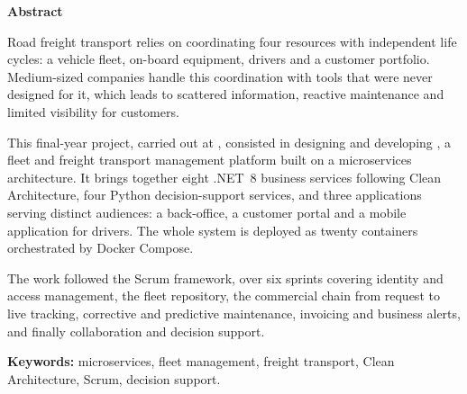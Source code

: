 \vspace{1.4cm}
\noindent{\color{grisFilet}\rule{\textwidth}{0.8pt}}
\vspace{1.4cm}

\begin{center}
  {\Large\sffamily\bfseries\color{noirTitre} Abstract\par}
\end{center}
\vspace{0.5cm}

Road freight transport relies on coordinating four resources with
independent life cycles: a vehicle fleet, on-board equipment, drivers and
a customer portfolio. Medium-sized companies handle this coordination
with tools that were never designed for it, which leads to scattered
information, reactive maintenance and limited visibility for customers.

This final-year project, carried out at \entreprise, consisted in
designing and developing \sujetCourt, a fleet and freight transport
management platform built on a microservices architecture. It brings
together eight .NET~8 business services following Clean Architecture,
four Python decision-support services, and three applications serving
distinct audiences: a back-office, a customer portal and a mobile
application for drivers. The whole system is deployed as twenty
containers orchestrated by Docker Compose.

The work followed the Scrum framework, over six sprints covering
identity and access management, the fleet repository, the commercial
chain from request to live tracking, corrective and predictive
maintenance, invoicing and business alerts, and finally collaboration and
decision support.

\vspace{0.4cm}
\noindent
\textbf{Keywords:} microservices, fleet management, freight transport,
Clean Architecture, Scrum, decision support.
